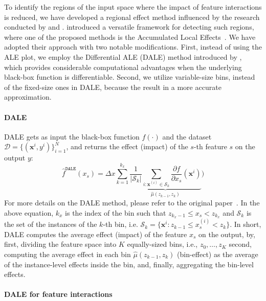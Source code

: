 \documentclass[12pt]{article}
\newcommand{\dfdx}{\frac{\partial f}{\partial x_s}}
\newcommand{\xb}{\mathbf{x}}
\begin{document}
To identify the regions of the input space where the impact of feature interactions is reduced,
we have developed a regional effect method influenced by the research conducted by
\citet{herbinger2023decomposing} and \citet{gkolemis2023dale}.
\citet{herbinger2023decomposing} introduced a versatile framework for detecting such regions,
where one of the proposed methods is the Accumulated Local Effects~\citep{apley2020visualizing}.
We have adopted their approach with two notable modifications.
First, instead of using the ALE plot, we employ the Differential ALE (DALE) method introduced by \citet{gkolemis2023dale},
which provides considerable computational advantages when the underlying black-box function is differentiable.
Second, we utilize variable-size bins, instead of the fixed-size ones in DALE, because the result in a more accurate approximation.

\paragraph{DALE}

DALE gets as input the black-box function \(f(\cdot)\)
and the dataset \(\mathcal{D} = \{(\xb^i, y^i)\}_{i=1}^N\),
and returns the effect (impact) of the $s$-th feature $s$ on the output $y$:
%
\begin{equation}  \label{eq:DALE_accumulated_mean_est}
  \hat{f}^{\mathtt{DALE}}(x_s) = \Delta x \sum_{k=1}^{k_x} \underbrace{\frac{1}{|\mathcal{S}_k|} \sum_{i:\mathbf{x}^{(i)} \in
    \mathcal{S}_k} \dfdx(\mathbf{x}^i)}_{\hat{\mu}(z_{k-1}, z_k)})
\end{equation}
%
For more details on the DALE method, please refer to the original paper~\citep{gkolemis2023dale}.
In the above equation, \(k_x\) is the index of the bin such that
\(z_{k_x-1} \leq x_s < z_{k_x} \) and \(\mathcal{S}_k\)
is the set of the instances of the \(k\)-th bin, i.e.
\( \mathcal{S}_k = \{ \xb^i : z_{k-1} \leq x^{(i)}_s < z_{k} \} \).
In short, DALE computes the average effect (impact) of the feature \(x_s\) on the output,
by, first, dividing the feature space into $K$ equally-sized bins, i.e., \(z_0, \ldots, z_K\)
second, computing the average effect in each bin \(\hat{\mu}(z_{k-1}, z_k)\) (bin-effect) as the average of the instance-level effects inside the bin,
and, finally, aggregating the bin-level effects.

\paragraph{DALE for feature interactions}
\end{document}
